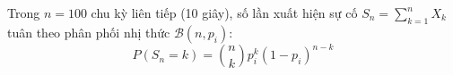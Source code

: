 \begin{table}[H]
\centering
\caption{Tham số mô hình Bernoulli và xác suất xuất hiện sự cố cảm biến trong một chu kỳ}
\label{tab:reliability-bernoulli}
\end{table}

Trong $n = 100$ chu kỳ liên tiếp (10 giây), số lần xuất hiện sự cố $S_n = \sum_{k=1}^n X_k$ tuân theo phân phối nhị thức $\mathcal{B}(n, p_i)$:
\begin{equation}
P(S_n = k) = \binom{n}{k} p_i^k (1 - p_i)^{n-k}
\label{eq:binomial-pmf-formula}
\end{equation}

